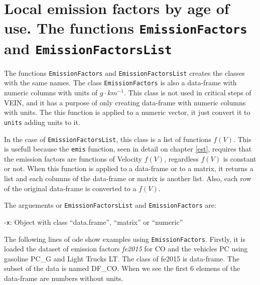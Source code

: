 \documentclass[12pt,graybox,envcountchap,sectrefs]{krantz}
\makeatletter
\newenvironment{Shaded}{\begin{snugshade}}{\end{snugshade}}
\newcommand{\KeywordTok}[1]{\textcolor[rgb]{0.13,0.29,0.53}{\textbf{#1}}}
\newcommand{\StringTok}[1]{\textcolor[rgb]{0.31,0.60,0.02}{#1}}
\newcommand{\CommentTok}[1]{\textcolor[rgb]{0.56,0.35,0.01}{\textit{#1}}}
\newcommand{\OperatorTok}[1]{\textcolor[rgb]{0.81,0.36,0.00}{\textbf{#1}}}
\newcommand{\NormalTok}[1]{#1}
\newenvironment{kframe}{%
\medskip{}
\setlength{\fboxsep}{.8em}
 \def\at@end@of@kframe{}%
 \ifinner\ifhmode%
  \def\at@end@of@kframe{\end{minipage}}%
  \begin{minipage}{\columnwidth}%
 \fi\fi%
 \def\FrameCommand##1{\hskip\@totalleftmargin \hskip-\fboxsep
 \colorbox{shadecolor}{##1}\hskip-\fboxsep
     \hskip-\linewidth \hskip-\@totalleftmargin \hskip\columnwidth}%
 \MakeFramed {\advance\hsize-\width
   \@totalleftmargin\z@ \linewidth\hsize
   \@setminipage}}%
 {\par\unskip\endMakeFramed%
 \at@end@of@kframe}
\renewenvironment{Shaded}{\begin{kframe}}{\end{kframe}}
\theoremstyle{definition}
\theoremstyle{definition}
\theoremstyle{definition}
\theoremstyle{remark}
\makeatother
\begin{document}
\section{\texorpdfstring{Local emission factors by age of use. The
functions \texttt{EmissionFactors} and
\texttt{EmissionFactorsList}}{Local emission factors by age of use. The functions EmissionFactors and EmissionFactorsList}}\label{localef}

The functions \texttt{EmissionFactors} and \texttt{EmissionFactorsList}
creates the classes with the same names. The class
\texttt{EmissionFactors} is also a data-frame with numeric columns with
units of \(g \cdot km^{-1}\). This class is not used in critical steps
of VEIN, and it has a purpose of only creating data-frame with numeric
columns with units. The this function is applied to a numeric vector, it
just convert it to \texttt{units} adding units to it.

In the case of \texttt{EmissionFactorsList}, this class is a list of
functions \(f(V)\). This is usefull because the \texttt{emis} function,
seen in detail on chapter \ref{est}, requires that the emission factors
are functions of Velocity \(f(V)\), regardless \(f(V)\) is constant or
not. When this function is applied to a data-frame or to a matrix, it
returns a list and each columns of the data-frame or matrix is another
list. Also, each row of the original data-frame is converted to a
\(f(V)\).

The arguements or \texttt{EmissionFactorsList} and
\texttt{EmissionFactors} are:

-\texttt{x}: Object with class ``data.frame'', ``matrix'' or ``numeric''

The following lines of ode show examples using \texttt{EmissionFactors}.
Firstly, it is loaded the dataset of emission factors \emph{fe2015} for
CO and the vehicles PC using gasoline PC\_G and Light Trucks LT. The
class of fe2015 is data-frame. The subset of the data is named DF\_CO.
When we see the first 6 elemens of the data-frame are numbers without
units.

\begin{Shaded}
\end{Shaded}
\end{document}
